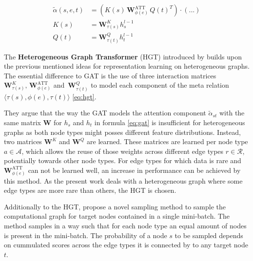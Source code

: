 \newpage

\begin{equation}
\begin{aligned}
\tilde{\alpha}(s, e, t) &= \left(K(s) \, \mathbf{W}^\text{ATT}_{\phi(e)} \, Q(t)^T\right) \cdot (...)  \\
K(s) &= \mathbf{W}^{K}_{\tau(s)}h^{l-1}_s \\
Q(t) &= \mathbf{W}^{Q}_{\tau(t)}h^{l-1}_t
\label{eq:hgt}
\end{aligned}
\end{equation}

The \textbf{Heterogeneous Graph Transformer} (HGT) introduced by \textcite{hu2020heterogeneous} builds upon the previous mentioned ideas for representation learning on heterogeneous graphs. 
The essential difference to GAT is the use of three interaction matrices  $\mathbf{W}^{K}_{\tau(s)}, \, \mathbf{W}^\text{ATT}_{\phi(e)}$ and $ \, \mathbf{W}^{Q}_{\tau(t)}$  to model each component of  the meta relation $\langle \tau(s), \phi(e), \tau(t) \rangle$ \eqref{eq:hgt}. 


They argue that the way the GAT models the attention component $\tilde{\alpha}_{st}$ with the same matrix $\mathbf{W}$ for $h_s$ and $h_t$ in formula \eqref{eq:gat} is insufficient for heterogeneous graphs as both node types might posses different feature distributions. Instead, two matrices $\mathbf{W}^{K}$ and $\mathbf{W}^{Q}$ are learned. These matrices are learned per node type  $a \in \mathcal{A}$, which allows the reuse of those weights across different edge types $r \in \mathcal{R}$, potentially towards other node types. For edge types for which data is rare and  $\mathbf{W}^\text{ATT}_{\phi(e)}$ can not be learned well, an increase in performance can be achieved by this method. As the present work deals with a heterogeneous graph where some edge types are more rare than others, the HGT is chosen. 



Additionally to the HGT,  \textcite{hu2020heterogeneous} propose a novel sampling method to sample the computational graph for target nodes contained in a single mini-batch. The method samples in a way such that for each node type an equal amount of nodes is present in the mini-batch. The probability of a node $s$ to be sampled depends on cummulated scores across the edge types  it is connected by to any target node $t$. 

